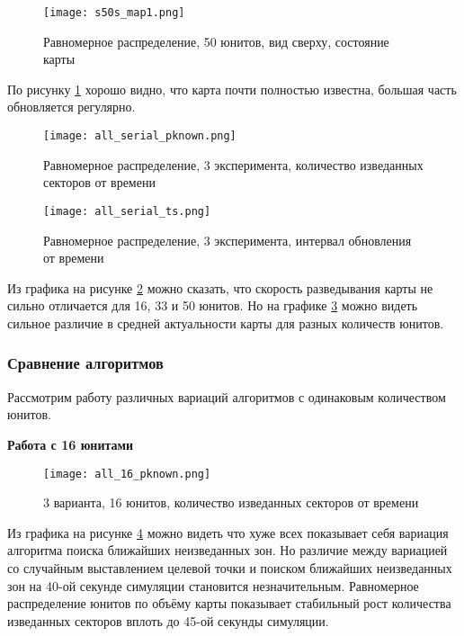 \begin{figure}[h!]
    \centering
    \texttt{[image: s50s\_map1.png]}
    \caption{Равномерное распределение, 50 юнитов, вид сверху, состояние карты}
    \label{fig:s50s_map1}
\end{figure}

По рисунку \ref{fig:s50s_map1} хорошо видно, что карта почти полностью известна, 
большая часть обновляется регулярно.

\begin{figure}[h!]
    \centering
    \texttt{[image: all\_serial\_pknown.png]}
    \caption{Равномерное распределение, 3 эксперимента, количество изведанных секторов от времени}
    \label{fig:all_serial_pk}
\end{figure}

\begin{figure}[h!]
    \centering
    \texttt{[image: all\_serial\_ts.png]}
    \caption{Равномерное распределение, 3 эксперимента, интервал обновления от времени}
    \label{fig:all_serial_ts}
\end{figure}

Из графика на рисунке \ref{fig:all_serial_pk} можно сказать, что скорость
разведывания карты не сильно отличается для 16, 33 и 50 юнитов. Но на
графике \ref{fig:all_serial_ts} можно видеть сильное различие в средней
актуальности карты для разных количеств юнитов.

\clearpage
\newpage

\subsubsection{Сравнение алгоритмов}

Рассмотрим работу различных вариаций алгоритмов с одинаковым количеством
юнитов.

\textbf{Работа с 16 юнитами}

\begin{figure}[h!]
    \centering
    \texttt{[image: all\_16\_pknown.png]}
    \caption{3 варианта, 16 юнитов, количество изведанных секторов от времени}
    \label{fig:all_16_pk}
\end{figure}

Из графика на рисунке \ref{fig:all_16_pk} можно видеть что хуже всех показывает
себя вариация алгоритма поиска ближайших неизведанных зон. Но различие между
вариацией со случайным выставлением целевой точки и поиском ближайших неизведанных
зон на 40-ой секунде симуляции становится незначительным. Равномерное распределение
юнитов по объёму карты показывает стабильный рост количества изведанных секторов
вплоть до 45-ой секунды симуляции.

